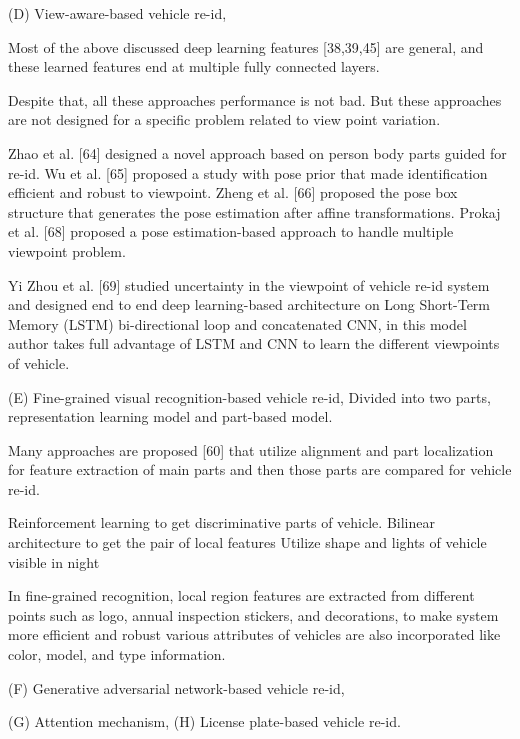 	
(D) View-aware-based vehicle re-id,

	Most of the above discussed deep learning features [38,39,45] are general, and these
learned features end at multiple fully connected layers. 
	
	Despite that, all these approaches
performance is not bad. But these approaches are not designed for a specific problem
related to view point variation. 
	
	Zhao et al. [64]
designed a novel approach based
on person body parts guided for re-id. Wu et al. [65] proposed a study with pose prior
	that made identification efficient and robust to viewpoint. Zheng et al. [66] proposed
the pose box structure that generates the pose estimation after affine transformations. Prokaj et al. [68] proposed a pose estimation-based approach to handle multiple
viewpoint problem.
	
	Yi Zhou et al. [69] studied uncertainty in the viewpoint of vehicle re-id
system and designed end to end deep learning-based architecture on Long Short-Term
Memory (LSTM) bi-directional loop and concatenated CNN, in this model author takes
full advantage of LSTM and CNN to learn the different viewpoints of vehicle. 
	
(E) Fine-grained visual recognition-based vehicle re-id, 
	Divided into two parts, representation learning model and part-based model. 
	
	Many
approaches are proposed [60] that utilize alignment and part localization for feature extraction of main parts and then those parts are compared for vehicle re-id. 
	
		Reinforcement learning to get
discriminative parts of vehicle.
		Bilinear architecture
to get the pair of local features
		Utilize shape and lights of vehicle visible in night 
		
		
	In fine-grained recognition, local region features are extracted from different points
such as logo, annual inspection stickers, and decorations, to make system more efficient
and robust various attributes of vehicles are also incorporated like color, model, and type
information. 
	
(F) Generative adversarial network-based vehicle re-id, 

(G) Attention mechanism, 
(H) License plate-based vehicle re-id.
